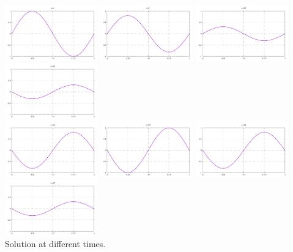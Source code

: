 \begin{center}
\includegraphics[width=4cm]{images/waveq/example1/u_0.pdf}
\includegraphics[width=4cm]{images/waveq/example1/u_1.pdf}
\includegraphics[width=4cm]{images/waveq/example1/u_2.pdf}
\includegraphics[width=4cm]{images/waveq/example1/u_3.pdf}\\
\includegraphics[width=4cm]{images/waveq/example1/u_4.pdf}
\includegraphics[width=4cm]{images/waveq/example1/u_5.pdf}
\includegraphics[width=4cm]{images/waveq/example1/u_6.pdf}
\includegraphics[width=4cm]{images/waveq/example1/u_7.pdf}\\
{\captionfont Solution at different times.}
\end{center}

